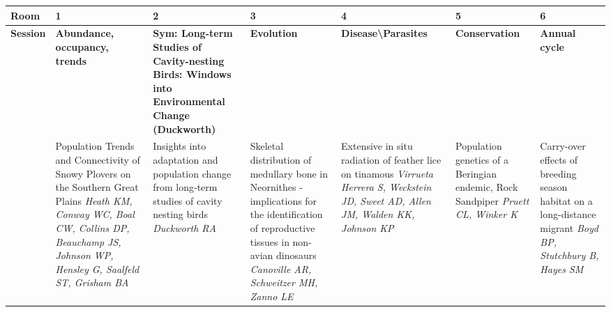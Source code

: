 \begin{tabular}{|x{0.75cm}|x{2.25cm}|a{2.25cm}|x{2.25cm}|x{2.25cm}|x{2.25cm}|x{2.25cm}|}\hline
Room & 1 & 2 & 3 & 4 & 5 & 6\\
\hline
\rule{0pt}{1em} \textbf{Session} &\footnotesize \textbf{Abundance, occupancy, trends} & \footnotesize \textbf{Sym: Long-term Studies of Cavity-nesting Birds: Windows into Environmental Change (Duckworth)} & \footnotesize \textbf{Evolution} & \footnotesize \textbf{Disease\textbackslash Parasites} & \footnotesize \textbf{Conservation} & \footnotesize \textbf{Annual cycle}\\
\hline
{}&Population Trends and Connectivity of Snowy Plovers on the Southern Great Plains \newline \newline \textit{Heath KM, Conway WC, Boal CW, Collins DP, Beauchamp JS, Johnson WP, Hensley G, Saalfeld ST, Grisham BA} & Insights into adaptation and population change from long‐term studies of cavity nesting birds \newline \newline \textit{Duckworth RA} & Skeletal distribution of medullary bone in Neornithes - implications for the identification of reproductive tissues in non-avian dinosaurs \newline \newline \textit{Canoville AR, Schweitzer MH, Zanno LE} & Extensive in situ radiation of feather lice on tinamous \newline \newline \textit{Virrueta Herrera S, Weckstein JD, Sweet AD, Allen JM, Walden KK, Johnson KP} & Population genetics of a Beringian endemic, Rock Sandpiper \newline \newline \textit{Pruett CL, Winker K} & Carry-over effects of breeding season habitat on a long-distance migrant \newline \newline \textit{Boyd BP, Stutchbury B, Hayes SM}\\
\hline

\end{tabular}
